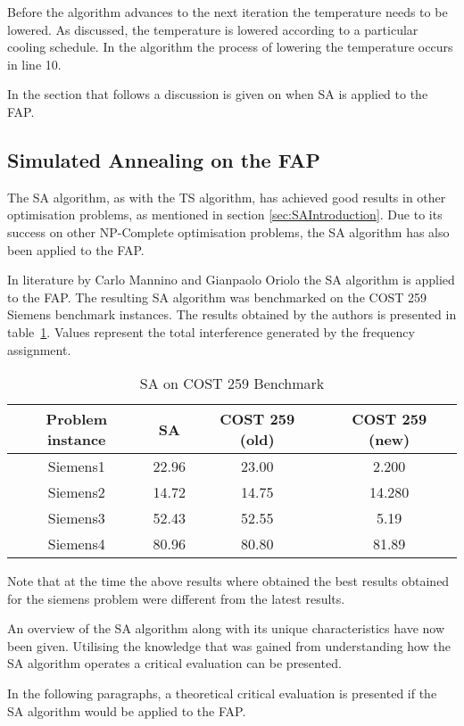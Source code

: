 Before the algorithm advances to the next iteration the temperature needs to be lowered. As discussed, the temperature is lowered according to a particular cooling schedule. In the algorithm the process of lowering the temperature occurs in line 10.

In the section that follows a discussion is given on when \gls{SA} is applied to the \gls{FAP}.
\subsection{Simulated Annealing on the \gls{FAP}}
The \gls{SA} algorithm, as with the \gls{TS} algorithm, has achieved good results in other optimisation problems, as mentioned in section \ref{sec:SAIntroduction}. Due to its success on other NP-Complete optimisation problems, the \gls{SA} algorithm has also been applied to the \gls{FAP}.

In literature by Carlo Mannino and Gianpaolo Oriolo\cite{SolvingSuperIntervalGraphs} the \gls{SA} algorithm is applied to the \gls{FAP}. The resulting \gls{SA} algorithm was benchmarked on the \gls{COST} 259 Siemens benchmark instances. The results obtained by the authors is presented in table~\ref{tab:SA}. Values represent the total interference generated by the frequency assignment. 
\begin{table}[H]
\centering
	\begin{tabular}{| c | c | c | c |}
	\hline
	Problem instance & \gls{SA} & \gls{COST} 259 (old) & \gls{COST} 259 (new) \\ \hline
	Siemens1 & 22.96 & 23.00 & 2.200\\ \hline
	Siemens2 & 14.72 & 14.75 & 14.280\\ \hline
	Siemens3 & 52.43 & 52.55 & 5.19\\ \hline
	Siemens4 & 80.96 & 80.80 & 81.89\\ \hline
	\end{tabular}
\caption{SA on \gls{COST} 259 Benchmark}
\label{tab:SA}
\end{table}
Note that at the time the above results where obtained the best results obtained for the siemens problem were different from the latest results.

An overview of the \gls{SA} algorithm along with its unique characteristics have now been given. Utilising the knowledge that was gained from understanding how the \gls{SA} algorithm operates a critical evaluation can be presented. 

In the following paragraphs, a theoretical critical evaluation is presented if the \gls{SA} algorithm would be applied to the \gls{FAP}.

